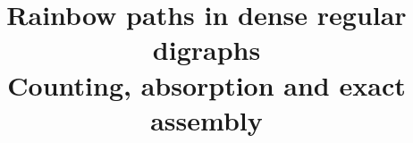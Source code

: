 \documentclass[english]{yupin-notes}
\title{Rainbow paths in dense regular digraphs\\[.2em]\large Counting, absorption and exact assembly}
\author{}
\date{}
\numberwithin{equation}{section}
\begin{document}
\maketitle
\begin{abstract}

\end{abstract}
\tableofcontents










\end{document}
